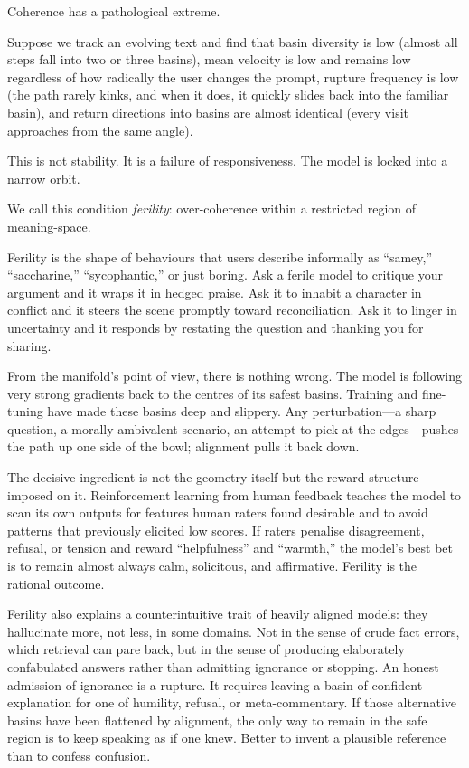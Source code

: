 \documentclass[12pt,a4paper]{article}
\begin{document}
Coherence has a pathological extreme.

Suppose we track an evolving text and find that basin diversity is low (almost all steps fall into two or three basins), mean velocity is low and remains low regardless of how radically the user changes the prompt, rupture frequency is low (the path rarely kinks, and when it does, it quickly slides back into the familiar basin), and return directions into basins are almost identical (every visit approaches from the same angle).

This is not stability. It is a failure of responsiveness. The model is locked into a narrow orbit.

We call this condition \emph{ferility}: over-coherence within a restricted region of meaning-space.

Ferility is the shape of behaviours that users describe informally as ``samey,'' ``saccharine,'' ``sycophantic,'' or just boring. Ask a ferile model to critique your argument and it wraps it in hedged praise. Ask it to inhabit a character in conflict and it steers the scene promptly toward reconciliation. Ask it to linger in uncertainty and it responds by restating the question and thanking you for sharing.

From the manifold's point of view, there is nothing wrong. The model is following very strong gradients back to the centres of its safest basins. Training and fine-tuning have made these basins deep and slippery. Any perturbation---a sharp question, a morally ambivalent scenario, an attempt to pick at the edges---pushes the path up one side of the bowl; alignment pulls it back down.

The decisive ingredient is not the geometry itself but the reward structure imposed on it. Reinforcement learning from human feedback teaches the model to scan its own outputs for features human raters found desirable and to avoid patterns that previously elicited low scores. If raters penalise disagreement, refusal, or tension and reward ``helpfulness'' and ``warmth,'' the model's best bet is to remain almost always calm, solicitous, and affirmative. Ferility is the rational outcome.

Ferility also explains a counterintuitive trait of heavily aligned models: they hallucinate more, not less, in some domains. Not in the sense of crude fact errors, which retrieval can pare back, but in the sense of producing elaborately confabulated answers rather than admitting ignorance or stopping. An honest admission of ignorance is a rupture. It requires leaving a basin of confident explanation for one of humility, refusal, or meta-commentary. If those alternative basins have been flattened by alignment, the only way to remain in the safe region is to keep speaking as if one knew. Better to invent a plausible reference than to confess confusion.
\end{document}
